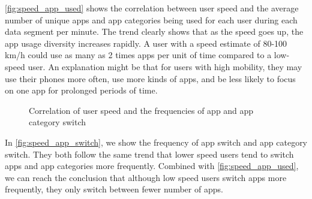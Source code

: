 \autoref{fig:speed_app_used} shows the correlation between user speed and the average number of unique apps and app categories being used for each user during each data segment per minute.
The trend clearly shows that as the speed goes up, the app usage diversity increases rapidly.
A user with a speed estimate of 80-100 km/h could use as many as 2 times apps per unit of time compared to a low-speed user.
An explanation might be that for users with high mobility, they may use their phones more often, use more kinds of apps, and be less likely to focus on one app for prolonged periods of time. 

\begin{figure}
    \centering
    \caption{Correlation of user speed and the frequencies of app and app category switch}
    \label{fig:speed_app_switch}
\end{figure}

In \autoref{fig:speed_app_switch}, we show the frequency of app switch and app category switch. They both follow the same trend that lower speed users tend to switch apps and app categories more frequently. Combined with \autoref{fig:speed_app_used}, we can reach the conclusion that although low speed users switch apps more frequently, they only switch between fewer number of apps.

